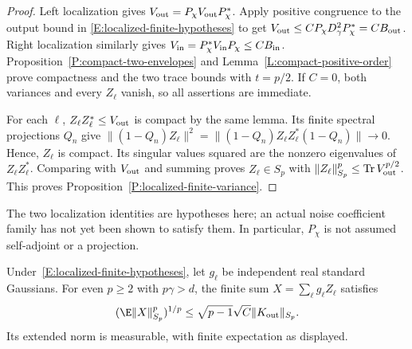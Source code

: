 \begin{proof}
  Left localization gives $V_{\rm out}=P_\chi V_{\rm out}P_\chi^*$.
  Apply positive congruence to the output bound in
  \eqref{E:localized-finite-hypotheses} to get
  $V_{\rm out}\le CP_\chi D_\gamma^2P_\chi^*=CB_{\rm out}$.
  Right localization similarly gives
  $V_{\rm in}=P_\chi^*V_{\rm in}P_\chi\le CB_{\rm in}$.
  Proposition~\ref{P:compact-two-envelopes} and
  Lemma~\ref{L:compact-positive-order} prove compactness and the two trace
  bounds with $t=p/2$. If $C=0$, both variances and every $Z_\ell$ vanish,
  so all assertions are immediate.

  For each $\ell$, $Z_\ell Z_\ell^*\le V_{\rm out}$ is compact by the
  same lemma. Its finite spectral projections $Q_n$ give
  $\|(1-Q_n)Z_\ell\|^2
  =\|(1-Q_n)Z_\ell Z_\ell^*(1-Q_n)\|\to0$.
  Hence, $Z_\ell$ is compact. Its singular values squared are the nonzero
  eigenvalues of $Z_\ell Z_\ell^*$. Comparing with $V_{\rm out}$ and
  summing proves $Z_\ell\in S_p$ with
  $\|Z_\ell\|_{S_p}^p\le\operatorname{Tr}V_{\rm out}^{p/2}$.
  This proves Proposition~\ref{P:localized-finite-variance}.
\end{proof}

The two localization identities are hypotheses here; an actual noise
coefficient family has not yet been shown to satisfy them. In particular,
$P_\chi$ is not assumed self-adjoint or a projection.

\begin{corollary}\label{C:finite-gaussian-operators}
  Under~\eqref{E:localized-finite-hypotheses}, let $g_\ell$ be independent
  real standard Gaussians. For even $p \ge 2$ with $p\gamma>d$, the finite
  sum $X=\sum_\ell g_\ell Z_\ell$ satisfies
  \begin{equation}\label{E:finite-gaussian-operator-bound}
    (\E\|X\|_{S_p}^p)^{1/p}
    \le\sqrt{p-1}\sqrt C\|K_{\rm out}\|_{S_p}.
  \end{equation}
  Its extended norm is measurable, with finite expectation as displayed.
\end{corollary}

